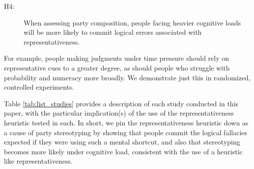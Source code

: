 \documentclass[12pt, letterpaper]{article}
\begin{document}
\begin{description}
\item[H4:] When assessing party composition, people facing heavier cognitive loads will be more likely to commit logical errors associated with representativeness.
\end{description} 

\noindent For example, people making judgments under time pressure should rely on representative cues to a greater degree, as should people who struggle with probability and numeracy more broadly. We demonstrate just this in randomized, controlled experiments.

Table \ref{tab:list_studies} provides a description of each study conducted in this paper, with the particular implication(s) of the use of the representativeness heuristic tested in each. In short, we pin the representativeness heuristic down as a cause of party stereotyping by showing that people commit the logical fallacies expected if they were using such a mental shortcut, and also that stereotyping becomes more likely under cognitive load, consistent with the use of a heuristic like representativeness.
\end{document}
